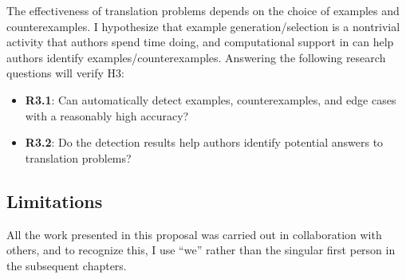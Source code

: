 
The effectiveness of translation problems depends on the choice of examples and counterexamples. I hypothesize that example generation/selection is a nontrivial activity that authors spend time doing, and computational support in \Edgeworth can help authors identify examples/counterexamples. Answering the following research questions will verify H3:

\begin{itemize}
    \item \textbf{R3.1}: Can \Edgeworth automatically detect examples, counterexamples, and edge cases with a reasonably high accuracy?
    \item \textbf{R3.2}: Do the detection results help authors identify potential answers to translation problems?
\end{itemize} \subsection{Limitations}


All the work presented in this proposal was carried out in collaboration with others, and to recognize this, I use ``we'' rather than the singular first person in the subsequent chapters.
